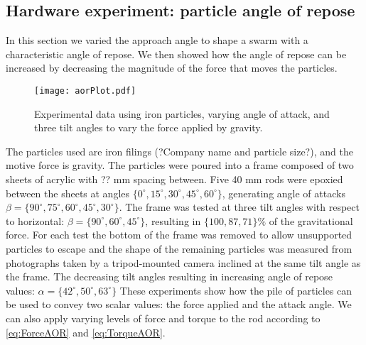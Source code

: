 \subsection{Hardware experiment: particle angle of repose}
In this section we varied the approach angle to shape a swarm with a characteristic angle of repose.  
We then showed how the angle of repose can be increased by decreasing the magnitude of the force that moves the particles.
%
\begin{figure}
\begin{center}
	\texttt{[image: aorPlot.pdf]}
\end{center}
\caption{\label{fig:angleOfReposeExp}
Experimental data using iron particles, varying angle of attack, and three tilt angles to vary the force applied by gravity.
}
\end{figure}
%
%
The particles used are iron filings (?Company name and particle size?), and the motive force is gravity. 
The particles were poured into a frame composed of two sheets of acrylic with ?? mm spacing between. Five 40 mm rods were epoxied between the sheets at angles 
 $\{0^\circ,15^\circ, 30^\circ, 45^\circ, 60^\circ \}$, generating angle of attacks $\beta = \{90^\circ,75^\circ, 60^\circ, 45^\circ, 30^\circ \}$.
 The frame was tested at three tilt angles with respect to horizontal: $\beta = \{90^\circ,60^\circ, 45^\circ \}$, resulting in $\{100,87, 71\}\%$ of the gravitational force.
 For each test the bottom of the frame was removed to allow unsupported particles to escape and the shape of the remaining particles was measured from photographs taken by a tripod-mounted camera inclined at the same tilt angle as the frame.
  The decreasing tilt angles resulting in increasing angle of repose values: $\alpha = \{42^\circ,50^\circ, 63^\circ \}$
These experiments show how the pile of particles can be used to convey two scalar values: the force applied and the attack angle.  We can also apply varying levels of force and torque to the rod according to \eqref{eq:ForceAOR} and \eqref{eq:TorqueAOR}.

